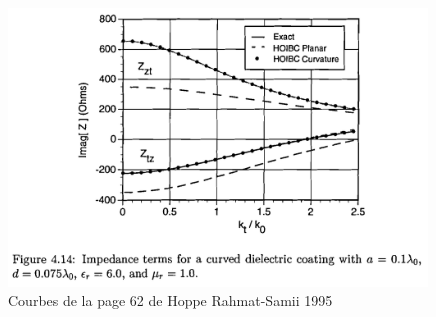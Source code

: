 \begin{figure}[h!tb]
    \includegraphics[width=0.99\textwidth]{images/hoppe/p62_imp_cylindre.png}
    \caption{Courbes de la page 62 de Hoppe Rahmat-Samii 1995}
    \label{fig:annex:hoppe:p62}
\end{figure}
